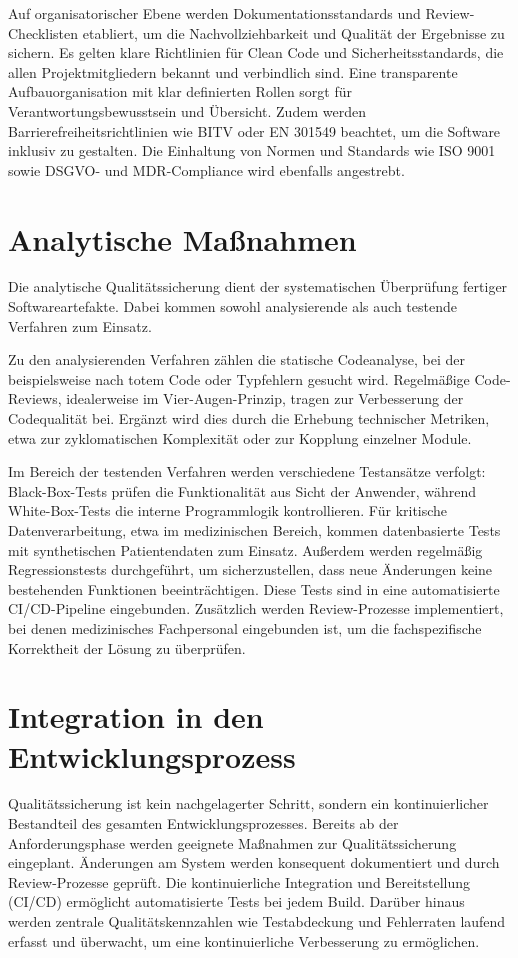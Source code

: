Auf organisatorischer Ebene werden Dokumentationsstandards und Review-Checklisten etabliert, um die Nachvollziehbarkeit und Qualität der Ergebnisse zu sichern. Es gelten klare Richtlinien für Clean Code und Sicherheitsstandards, die allen Projektmitgliedern bekannt und verbindlich sind. Eine transparente Aufbauorganisation mit klar definierten Rollen sorgt für Verantwortungsbewusstsein und Übersicht. Zudem werden Barrierefreiheitsrichtlinien wie BITV oder EN 301549 beachtet, um die Software inklusiv zu gestalten. Die Einhaltung von Normen und Standards wie ISO 9001 sowie DSGVO- und MDR-Compliance wird ebenfalls angestrebt.

\section{Analytische Maßnahmen}

Die analytische Qualitätssicherung dient der systematischen Überprüfung fertiger Softwareartefakte. Dabei kommen sowohl analysierende als auch testende Verfahren zum Einsatz.

Zu den analysierenden Verfahren zählen die statische Codeanalyse, bei der beispielsweise nach totem Code oder Typfehlern gesucht wird. Regelmäßige Code-Reviews, idealerweise im Vier-Augen-Prinzip, tragen zur Verbesserung der Codequalität bei. Ergänzt wird dies durch die Erhebung technischer Metriken, etwa zur zyklomatischen Komplexität oder zur Kopplung einzelner Module.

Im Bereich der testenden Verfahren werden verschiedene Testansätze verfolgt: Black-Box-Tests prüfen die Funktionalität aus Sicht der Anwender, während White-Box-Tests die interne Programmlogik kontrollieren. Für kritische Datenverarbeitung, etwa im medizinischen Bereich, kommen datenbasierte Tests mit synthetischen Patientendaten zum Einsatz. Außerdem werden regelmäßig Regressionstests durchgeführt, um sicherzustellen, dass neue Änderungen keine bestehenden Funktionen beeinträchtigen. Diese Tests sind in eine automatisierte CI/CD-Pipeline eingebunden. Zusätzlich werden Review-Prozesse implementiert, bei denen medizinisches Fachpersonal eingebunden ist, um die fachspezifische Korrektheit der Lösung zu überprüfen.

\section{Integration in den Entwicklungsprozess}

Qualitätssicherung ist kein nachgelagerter Schritt, sondern ein kontinuierlicher Bestandteil des gesamten Entwicklungsprozesses. Bereits ab der Anforderungsphase werden geeignete Maßnahmen zur Qualitätssicherung eingeplant. Änderungen am System werden konsequent dokumentiert und durch Review-Prozesse geprüft. Die kontinuierliche Integration und Bereitstellung (CI/CD) ermöglicht automatisierte Tests bei jedem Build. Darüber hinaus werden zentrale Qualitätskennzahlen wie Testabdeckung und Fehlerraten laufend erfasst und überwacht, um eine kontinuierliche Verbesserung zu ermöglichen.

